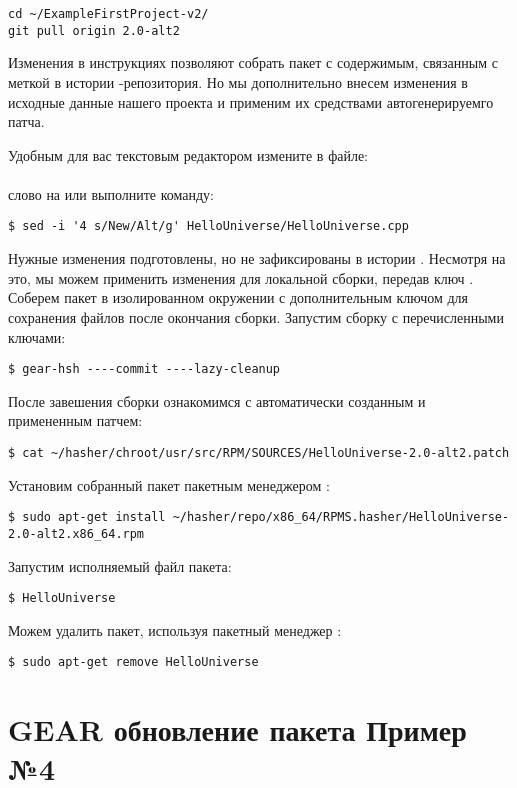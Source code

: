 \begin{verbatim}
cd ~/ExampleFirstProject-v2/
git pull origin 2.0-alt2
\end{verbatim}

Изменения в инструкциях позволяют собрать пакет с содержимым, связанным с меткой
 в истории -репозитория. Но мы дополнительно внесем изменения
в исходные данные нашего проекта и применим их средствами автогенерируемго патча.

Удобным для вас текстовым редактором измените в файле:\\
\\
слово  на  или выполните команду:
\begin{verbatim}
$ sed -i '4 s/New/Alt/g' HelloUniverse/HelloUniverse.cpp
\end{verbatim}

Нужные изменения подготовлены, но не зафиксированы в истории . Несмотря на это,
мы можем применить изменения для локальной сборки, передав  ключ .
Соберем пакет в изолированном окружении с  дополнительным ключом  для
сохранения файлов после окончания сборки.
Запустим сборку с перечисленными ключами:
\begin{verbatim}
$ gear-hsh ----commit ----lazy-cleanup
\end{verbatim}

После завешения сборки ознакомимся с автоматически созданным и примененным патчем:
\begin{verbatim}
$ cat ~/hasher/chroot/usr/src/RPM/SOURCES/HelloUniverse-2.0-alt2.patch
\end{verbatim}

Установим  собранный пакет пакетным менеджером :
\begin{verbatim}
$ sudo apt-get install ~/hasher/repo/x86_64/RPMS.hasher/HelloUniverse-2.0-alt2.x86_64.rpm
\end{verbatim}

Запустим исполняемый файл пакета:
\begin{verbatim}
$ HelloUniverse
\end{verbatim}

Можем удалить пакет, используя пакетный менеджер :
\begin{verbatim}
$ sudo apt-get remove HelloUniverse
\end{verbatim}

\section{GEAR обновление пакета \textbf{Пример №4}}

